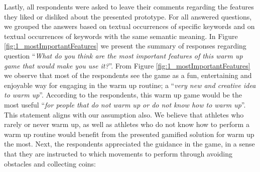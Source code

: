 Lastly, all respondents were asked to leave their comments regarding the features they liked or disliked about the presented prototype. For all answered questions, we grouped the answers based on textual occurrences of specific keywords and on textual occurrences of keywords with the same semantic meaning. In Figure \ref{fig:1_mostImportantFeatures} we present the summary of responses regarding question ``\textit{What do you think are the most important features of this warm up game that would make you use it?}''. From Figure \ref{fig:1_mostImportantFeatures} we observe that most of the respondents see the game as a fun, entertaining and enjoyable way for engaging in the warm up routine; a ``\textit{very new and creative idea to warm up}''. According to the respondents, this warm up game would be the most useful ``\textit{for people that do not warm up or do not know how to warm up}''. This statement aligns with our assumption also. We believe that athletes who rarely or never warm up, as well as athletes who do not know how to perform a warm up routine would benefit from the presented gamified solution for warm up the most. Next, the respondents appreciated the guidance in the game, in a sense that they are instructed to which movements to perform through avoiding obstacles and collecting coins:
